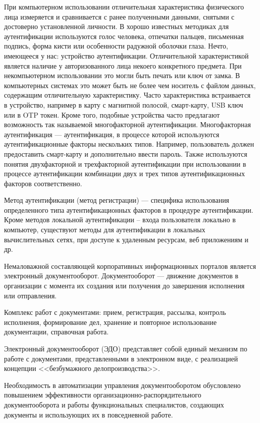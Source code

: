 При компьютерном использовании отличительная характеристика физического лица
измеряется и сравнивается с ранее полученными данными, снятыми с достоверно
установленной личности. В хорошо известных методиках для аутентификации
используются голос человека, отпечатки пальцев, письменная подпись, форма кисти
или особенности радужной оболочки глаза. Нечто, имеющееся у нас: устройство
аутентификации. Отличительной характеристикой является наличие у авторизованного
лица некоего конкретного предмета. При некомпьютерном использовании это могли
быть печать или ключ от замка. В компьютерных системах это может быть не более
чем носитель с файлом данных, содержащим отличительную характеристику. Часто
характеристика встраивается в устройство, например в карту с магнитной полосой,
смарт-карту, USB ключ или в OTP токен. Кроме того, подобные устройства часто
предлагают возможность так называемой многофакторной аутентификации.
Многофакторная аутентификация — аутентификация, в процессе которой используются
аутентификационные факторы нескольких типов. Например, пользователь должен
предоставить смарт-карту и дополнительно ввести пароль. Также используются
понятия двухфакторной и трехфакторной аутентификации при использовании в
процессе аутентификации комбинации двух и трех типов аутентификационных факторов
соответственно.

Метод аутентификации (метод регистрации) --- специфика использования
определенного типа аутентификационных факторов в процедуре аутентификации. Кроме
методов локальной аутентификации -- входа пользователя локально в компьютер,
существуют методы для аутентификации в локальных вычислительных сетях, при
доступе к удаленным ресурсам, веб приложениям и др.

Немаловажной составляющей корпоративных информационных порталов является
электронный документооборот. Документооборот --- движение документов в
организации с момента их создания или получения до завершения исполнения или
отправления.~\cite{GOST_P51141}

Комплекс работ с документами: прием, регистрация, рассылка, контроль исполнения,
формирование дел, хранение и повторное использование документации, справочная
работа.

Электронный документооборот (ЭДО) представляет собой единый механизм по работе с
документами, представленными в электронном виде, с реализацией концепции
<<безбумажного делопроизводства>>.

Необходимость в автоматизации управления документооборотом обусловлено
повышением эффективности организационно-распорядительного документооборота и
работы функциональных специалистов, создающих документы и использующих их в
повседневной работе.

